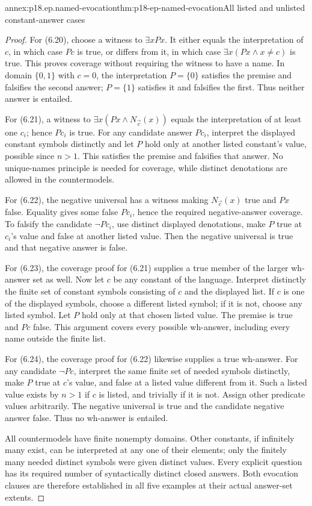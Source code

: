 \begin{annexitem}{annex:p18.ep.named-evocation}{thm:p18-ep-named-evocation}{All listed and unlisted constant-answer cases}
\begin{proof}
For (6.20), choose a witness to \(\exists xPx\). It either equals the
interpretation of \(c\), in which case \(Pc\) is true, or differs from
it, in which case \(\exists x(Px\land x\ne c)\) is true. This proves
coverage without requiring the witness to have a name. In domain
\(\{0,1\}\) with \(c=0\), the interpretation \(P=\{0\}\)
satisfies the premise and falsifies the second answer; \(P=\{1\}\)
satisfies it and falsifies the first. Thus neither answer is entailed.

For (6.21), a witness to \(\exists x(Px\land N_{\vec c}(x))\)
equals the interpretation of at least one \(c_i\); hence \(Pc_i\)
is true. For any candidate answer \(Pc_i\), interpret the displayed
constant symbols distinctly and let \(P\) hold only at another listed
constant's value, possible since \(n>1\). This satisfies the premise
and falsifies that answer. No unique-names principle is needed for
coverage, while distinct denotations are allowed in the countermodels.

For (6.22), the negative universal has a witness making
\(N_{\vec c}(x)\) true and \(Px\) false. Equality gives some false
\(Pc_i\), hence the required negative-answer coverage. To falsify
the candidate \(\neg Pc_i\), use distinct displayed denotations,
make \(P\) true at \(c_i\)'s value and false at another listed value.
Then the negative universal is true and that negative answer is false.

For (6.23), the coverage proof for (6.21) supplies a true member of the
larger wh-answer set as well. Now let \(c\) be any constant of the
language. Interpret distinctly the finite set of constant symbols
consisting of \(c\) and the displayed list. If \(c\) is one of
the displayed symbols, choose a different listed symbol; if it is not,
choose any listed symbol. Let \(P\) hold only at that chosen listed
value. The premise is true and \(Pc\) false. This argument covers
every possible wh-answer, including every name outside the finite list.

For (6.24), the coverage proof for (6.22) likewise supplies a true
wh-answer. For any candidate \(\neg Pc\), interpret the same finite
set of needed symbols distinctly, make \(P\) true at \(c\)'s value,
and false at a listed value different from it. Such a listed value exists
by \(n>1\) if \(c\) is listed, and trivially if it is not. Assign
other predicate values arbitrarily. The negative universal is true
and the candidate negative answer false. Thus no wh-answer is entailed.

All countermodels have finite nonempty domains. Other constants, if
infinitely many exist, can be interpreted at any one of their elements;
only the finitely many needed distinct symbols were given distinct values.
Every explicit question has its required number of syntactically distinct
closed answers. Both evocation clauses are therefore established in all
five examples at their actual answer-set extents.
\end{proof}
\end{annexitem}

